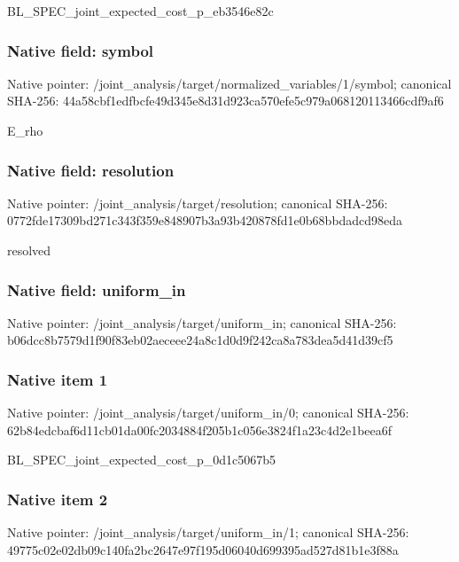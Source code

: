 \documentclass[10pt,a4paper]{article}
\begin{document}
BL\_SPEC\_joint\_expected\_c\allowbreak{}ost\_p\_eb3546e82c


\subsubsection{Native field: symbol}


Native pointer: /joint\_analysis/target/n\allowbreak{}ormalized\_variables/1/sy\allowbreak{}mbol; canonical SHA-256: 44a58cbf1edfbcfe49d345e8\allowbreak{}d31d923ca570efe5c979a068\allowbreak{}120113466cdf9af6


E\_rho


\subsubsection{Native field: resolution}


Native pointer: /joint\_analysis/target/resolution; canonical SHA-256: 0772fde17309bd271c343f35\allowbreak{}9e848907b3a93b420878fd1e\allowbreak{}0b68bbdadcd98eda


resolved


\subsubsection{Native field: uniform\_in}


Native pointer: /joint\_analysis/target/uniform\_in; canonical SHA-256: b06dcc8b7579d1f90f83eb02\allowbreak{}aeceee24a8c1d0d9f242ca8a\allowbreak{}783dea5d41d39cf5



\subsubsection{Native item 1}


Native pointer: /joint\_analysis/target/uniform\_in/0; canonical SHA-256: 62b84edcbaf6d11cb01da00f\allowbreak{}c2034884f205b1c056e3824f\allowbreak{}1a23c4d2e1beea6f


BL\_SPEC\_joint\_expected\_c\allowbreak{}ost\_p\_0d1c5067b5


\subsubsection{Native item 2}


Native pointer: /joint\_analysis/target/uniform\_in/1; canonical SHA-256: 49775c02e02db09c140fa2bc\allowbreak{}2647e97f195d06040d699395\allowbreak{}ad527d81b1e3f88a
\end{document}
